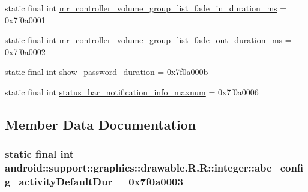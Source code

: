 \begin{CompactItemize}
static final int \hyperlink{classandroid_1_1support_1_1graphics_1_1drawable_1_1_r_1_1integer_66ab2cb9e5ee25161d0ed482b5c52123}{mr\_\-controller\_\-volume\_\-group\_\-list\_\-fade\_\-in\_\-duration\_\-ms} = 0x7f0a0001
\item 
static final int \hyperlink{classandroid_1_1support_1_1graphics_1_1drawable_1_1_r_1_1integer_ee4ec8c72a0664d9729434a4cf1d00e4}{mr\_\-controller\_\-volume\_\-group\_\-list\_\-fade\_\-out\_\-duration\_\-ms} = 0x7f0a0002
\item 
static final int \hyperlink{classandroid_1_1support_1_1graphics_1_1drawable_1_1_r_1_1integer_1424c9704e4ca052e9b112e92e7bae9e}{show\_\-password\_\-duration} = 0x7f0a000b
\item 
static final int \hyperlink{classandroid_1_1support_1_1graphics_1_1drawable_1_1_r_1_1integer_17ddf11ac5903d2c5866ebab649ded00}{status\_\-bar\_\-notification\_\-info\_\-maxnum} = 0x7f0a0006
\end{CompactItemize}


\subsection{Member Data Documentation}
\hypertarget{classandroid_1_1support_1_1graphics_1_1drawable_1_1_r_1_1integer_bdb1254574902e5e113a9ff2b2ca8f8c}{
\subsubsection[{abc\_\-config\_\-activityDefaultDur}]{\setlength{\rightskip}{0pt plus 5cm}static final int android::support::graphics::drawable.R.R::integer::abc\_\-config\_\-activityDefaultDur = 0x7f0a0003}}
\label{classandroid_1_1support_1_1graphics_1_1drawable_1_1_r_1_1integer_bdb1254574902e5e113a9ff2b2ca8f8c}


